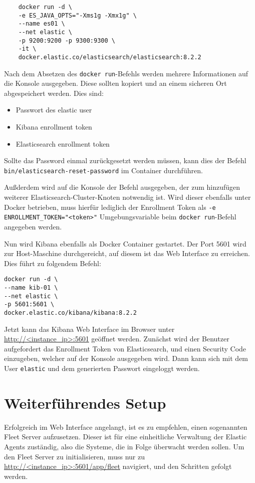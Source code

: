 \begin{verbatim}
	docker run -d \
	-e ES_JAVA_OPTS="-Xms1g -Xmx1g" \
	--name es01 \
	--net elastic \
	-p 9200:9200 -p 9300:9300 \
	-it \
	docker.elastic.co/elasticsearch/elasticsearch:8.2.2
\end{verbatim}

Nach dem Absetzen des \verb|docker run|-Befehls werden
mehrere Informationen auf die Konsole ausgegeben. Diese sollten
kopiert und an einem sicheren Ort abgespeichert werden.
Dies sind:

\begin{itemize}
	\item Passwort des elastic user
	\item Kibana enrollment token
	\item Elasticsearch enrollment token
\end{itemize}

Sollte das Password einmal zurückgesetzt werden müssen,
kann dies der Befehl
\verb|bin/elasticsearch-reset-password| im Container durchführen.

Außderdem wird auf die Konsole der Befehl ausgegeben, der zum
hinzufügen weiterer Elasticsearch-Cluster-Knoten notwendig ist.
Wird dieser ebenfalls unter Docker betrieben, muss hierfür lediglich
der Enrollment Token als \verb|-e ENROLLMENT_TOKEN="<token>"|
Umgebungsvariable beim \verb|docker run|-Befehl angegeben werden.

Nun wird Kibana ebenfalls als Docker Container gestartet.
Der Port 5601 wird zur Host-Maschine durchgereicht,
auf diesem ist das Web Interface zu erreichen.
Dies führt zu folgendem Befehl:

\begin{verbatim}
docker run -d \
--name kib-01 \
--net elastic \
-p 5601:5601 \
docker.elastic.co/kibana/kibana:8.2.2
\end{verbatim}

Jetzt kann das Kibana Web Interface im Browser
unter \url{http://<instance_ip>:5601} geöffnet werden.
Zunächst wird der Benutzer aufgefordert das Enrollment Token
von Elasticsearch,
und einen Security Code einzugeben, welcher auf der Konsole ausgegeben wird.
Dann kann sich mit dem User \verb|elastic| und dem generierten Passwort eingeloggt werden.

\section{Weiterführendes Setup}
Erfolgreich im Web Interface angelangt, ist es zu empfehlen,
einen sogenannten Fleet Server aufzusetzen. Dieser ist für eine
einheitliche Verwaltung der Elastic Agents zuständig, also
die Systeme, die in Folge überwacht werden sollen.
Um den Fleet Server zu initialisieren, muss nur zu
\url{http://<instance_ip>:5601/app/fleet} navigiert,
und den Schritten gefolgt werden.


